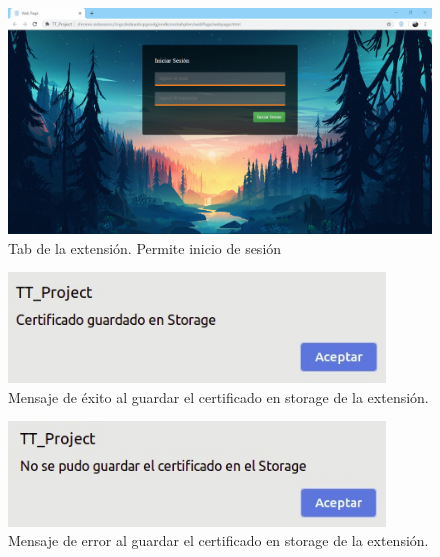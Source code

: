 \documentclass[12pt, a4paper, titlepage]{report}
\begin{document}
    		    \begin{figure}[H]
    				\begin{center}	\includegraphics[width=15cm]{./imagenes/Desarrollo/Prototipo_2/UI_webpage.PNG}
    					\caption{Tab de la extensión. Permite inicio de sesión}
    				\end{center}
    			\end{figure}
    			
    			\begin{figure}[H]
    				\begin{center}	\includegraphics[width=10cm]{./imagenes/Desarrollo/Prototipo_2/UI_certSavedInStorage.jpeg}
    					\caption[Mensaje de éxito]{Mensaje de éxito al guardar el certificado en storage de la extensión.}
    				\end{center}
    			\end{figure}
    			\label{UI_certSavedInStorage}
    			
    			\begin{figure}[H]
    				\begin{center}	\includegraphics[width=10cm]{./imagenes/Desarrollo/Prototipo_2/UI_certNotSavedInStorage.jpeg}
    					\caption[Mensaje de error]{Mensaje de error al guardar el certificado en storage de la extensión.}
    				\end{center}
    			\end{figure}
    			\label{UI_certNotSavedInStorage}
    			
\end{document}
